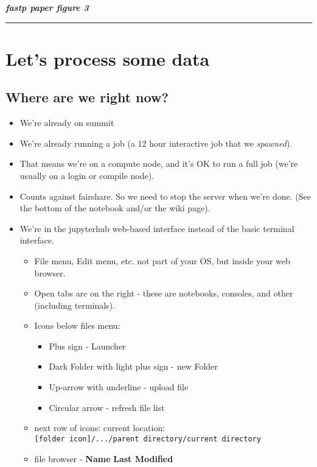\documentclass[11pt]{article}
\providecommand{\tightlist}{%
      \setlength{\itemsep}{0pt}\setlength{\parskip}{0pt}}
\begin{document}
\textbf{\emph{fastp paper figure 3}}

\begin{center}\rule{0.5\linewidth}{\linethickness}\end{center}

    \hypertarget{lets-process-some-data}{%
\section{Let's process some data}\label{lets-process-some-data}}

\hypertarget{where-are-we-right-now}{%
\subsection{Where are we right now?}\label{where-are-we-right-now}}

\begin{itemize}
\tightlist
\item
  We're already on summit
\item
  We're already running a job (a 12 hour interactive job that we
  \emph{spawned}).
\item
  That means we're on a compute node, and it's OK to run a full job
  (we're usually on a login or compile node).
\item
  Counts against fairshare. So we need to stop the server when we're
  done. (See the bottom of the notebook and/or the wiki page).
\item
  We're in the jupyterhub web-based interface instead of the basic
  terminal interface.

  \begin{itemize}
  \tightlist
  \item
    File menu, Edit menu, etc. not part of your OS, but inside your web
    browser.
  \item
    Open tabs are on the right - these are notebooks, consoles, and
    other (including terminals).
  \item
    Icons below files menu:

    \begin{itemize}
    \tightlist
    \item
      Plus sign - Launcher
    \item
      Dark Folder with light plus sign - new Folder
    \item
      Up-arrow with underline - upload file
    \item
      Circular arrow - refresh file list
    \end{itemize}
  \item
    next row of icons: current location:
    \texttt{{[}folder\ icon{]}/.../parent\ directory/current\ directory}
  \item
    file browser - \textbf{Name} \textbf{Last Modified}
  \end{itemize}
\end{itemize}
\end{document}
